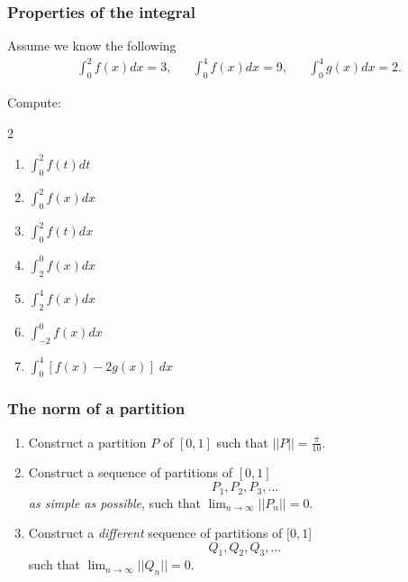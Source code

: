 \documentclass[14pt]{beamer}
\begin{document}
\begin{frame}
	\fontsize{13}{13}\selectfont
	\frametitle{Properties of the integral}

	Assume we know the following
	\begin{align*}
		 & \int_{0}^{2}f(x) dx = 3, &  & \int_{0}^{4}f(x) dx = 9, &  & \int_{0}^{4}g(x) dx = 2.
	\end{align*}

	Compute:
	\begin{multicols}{2}
		\begin{enumerate}
			\item $\displaystyle \int_{0}^{2}f(t) dt$

			\item $\displaystyle \int_{0}^{2}f(x) dx$

			\item $\displaystyle \int_{0}^{2}f(t) dx$

			\item $\displaystyle \int_{2}^{0}f(x) dx$

			\item $\displaystyle \int_{2}^{4}f(x) dx$

			\item $\displaystyle \int_{-2}^{0}f(x) dx$

			\item $\displaystyle \int_{0}^{4}\left[ f(x) - 2g(x) \right] \; dx$
		\end{enumerate}
	\end{multicols}
	\vfill
\end{frame}

\begin{frame}[t]
	\fontsize{13}{13}\selectfont
	\frametitle{The norm of a partition}

	\begin{enumerate}
		\item Construct a partition $P$ of $[0,1]$ such that $\displaystyle ||P|| = \frac{\pi}{10}$.

		\item Construct a sequence of partitions of $[0,1]$
			\[
				P_{1}, P_{2}, P_{3}, \ldots
			\]
			\emph{as simple as possible}, such that $\displaystyle \lim_{n \to \infty}|
			|P_{n}|| = 0$.

		\item Construct a \emph{different} sequence of partitions of $[0,1$]
			\[
				Q_{1}, Q_{2}, Q_{3}, \ldots
			\]
			such that $\displaystyle \lim_{n \to \infty}||Q_{n}|| = 0$.
	\end{enumerate}
\end{frame}
\end{document}
